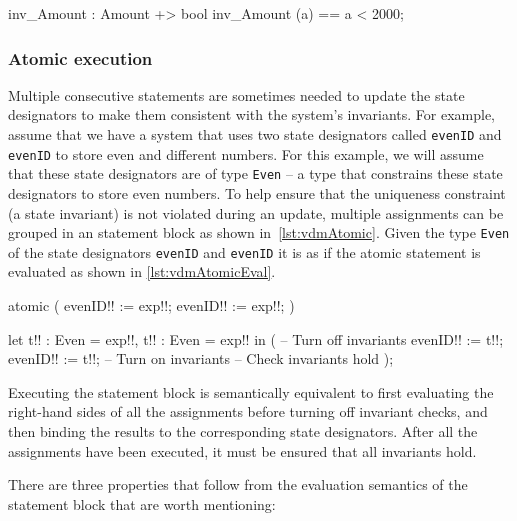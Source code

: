 \begin{vdmsl}[style=customVdm,caption={Invariant function for type
definition \texttt{Amount}.},label={lst:vdmTypeInv}]
inv_Amount : Amount +> bool
inv_Amount (a) == a < 2000;
\end{vdmsl}

\subsubsection{Atomic execution}

Multiple consecutive statements are sometimes needed to update the
state designators to make them consistent with the system's
invariants. For example, assume that we have a system that uses two
state designators called \texttt{evenID} and
\texttt{evenID} to store even and different numbers. For this
example, we will assume that these state designators are of type
\texttt{Even} -- a type that constrains these state designators to
store even numbers. To help ensure that the uniqueness constraint (a
state invariant) is not violated during an update, multiple
assignments can be grouped in an  statement block as shown
in~\autoref{lst:vdmAtomic}. Given the type \texttt{Even} of the state designators
\texttt{evenID} and \texttt{evenID} it is as if the
atomic statement is evaluated as shown in \autoref{lst:vdmAtomicEval}.

\begin{vdmsl}[style=customVdm,caption={Atomic update in
\ac{vdm}.},label={lst:vdmAtomic}]
atomic (
 evenID!! := exp!!;
 evenID!! := exp!!;
)
\end{vdmsl}


\begin{vdmsl}[style=customVdm,caption={The execution semantics of the
\kw{atomic} statement.},label={lst:vdmAtomicEval}]
let t!! : Even = exp!!,
    t!! : Even = exp!!
in (
 -- Turn off invariants
 evenID!! := t!!;
 evenID!! := t!!;
 -- Turn on invariants
 -- Check invariants hold
);
\end{vdmsl}

Executing the  statement block is semantically equivalent
to first evaluating the right-hand sides of all the assignments before
turning off invariant checks, and then binding the results to the
corresponding state designators. After all the assignments have been
executed, it must be ensured that all invariants hold.

There are three properties that follow from the evaluation semantics
of the  statement block that are worth mentioning:

